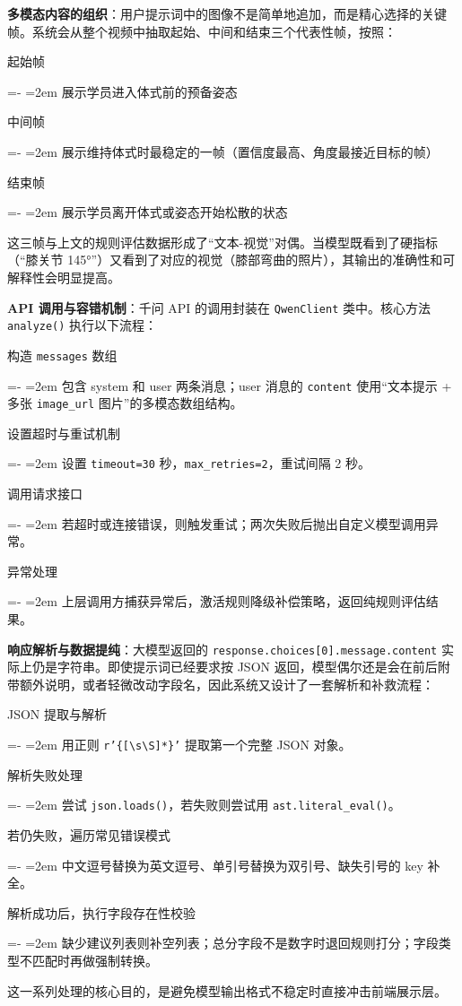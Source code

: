 \documentclass[UTF8,twoside]{ctexrep}
\makeatletter
\def@NAT@last@yr{\@citea}%
\def@NAT@last@yr{-\NAT@penalty}%
\newcommand{\researchitem}[2]{%
  \item #1%
  \par\begingroup
    \leftskip=-\leftmargin
    \rightskip=0pt
    \parindent=2em
    \noindent\hspace*{2em}\ignorespaces#2\unskip\par
  \endgroup
}
\makeatother
\begin{document}
\textbf{多模态内容的组织}：用户提示词中的图像不是简单地追加，而是精心选择的关键帧。系统会从整个视频中抽取起始、中间和结束三个代表性帧，按照：

\begin{researchlist}
  
  \researchitem{起始帧}{展示学员进入体式前的预备姿态}
  
  \researchitem{中间帧}{展示维持体式时最稳定的一帧（置信度最高、角度最接近目标的帧）}
  
  \researchitem{结束帧}{展示学员离开体式或姿态开始松散的状态}
\end{researchlist}

这三帧与上文的规则评估数据形成了“文本-视觉”对偶。当模型既看到了硬指标（“膝关节 145°”）又看到了对应的视觉（膝部弯曲的照片），其输出的准确性和可解释性会明显提高。

\textbf{API 调用与容错机制}：千问 API 的调用封装在 \texttt{QwenClient} 类中。核心方法 \texttt{analyze()} 执行以下流程：
\begin{researchlist}
  \researchitem{构造 \texttt{messages} 数组}{
    包含 system 和 user 两条消息；user 消息的 \texttt{content} 使用“文本提示 + 多张 \texttt{image\_url} 图片”的多模态数组结构。
  }
  \researchitem{设置超时与重试机制}{
    设置 \texttt{timeout=30} 秒，\texttt{max\_retries=2}，重试间隔 2 秒。
  }
  \researchitem{调用请求接口}{
    若超时或连接错误，则触发重试；两次失败后抛出自定义模型调用异常。
  }
  \researchitem{异常处理}{
    上层调用方捕获异常后，激活规则降级补偿策略，返回纯规则评估结果。
  }
\end{researchlist}

\textbf{响应解析与数据提纯}：大模型返回的 \texttt{response.choices[0].message.content} 实际上仍是字符串。即使提示词已经要求按 JSON 返回，模型偶尔还是会在前后附带额外说明，或者轻微改动字段名，因此系统又设计了一套解析和补救流程：
\begin{researchlist}
  \researchitem{JSON 提取与解析}{
    用正则 \texttt{r'\{[\textbackslash s\textbackslash S]*\}'} 提取第一个完整 JSON 对象。
  }
  \researchitem{解析失败处理}{
    尝试 \texttt{json.loads()}，若失败则尝试用 \texttt{ast.literal\_eval()}。
  }
  
\researchitem{若仍失败，遍历常见错误模式}{中文逗号替换为英文逗号、单引号替换为双引号、缺失引号的 key 补全。}
  
\researchitem{解析成功后，执行字段存在性校验}{缺少建议列表则补空列表；总分字段不是数字时退回规则打分；字段类型不匹配时再做强制转换。}
\end{researchlist}
这一系列处理的核心目的，是避免模型输出格式不稳定时直接冲击前端展示层。
\end{document}

